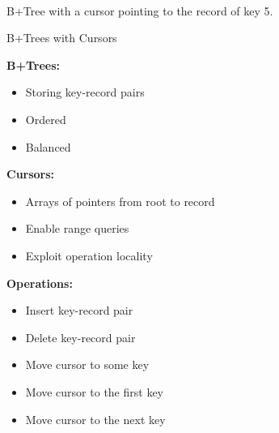 \documentclass[usenames,dvipsnames]{beamer}
\def\sublock#1{\textbf{#1:}\\\vspace{0.5cm}}
\def\subsep{\vspace{1cm}}
\begin{document}
\begin{frame}[fragile]
\begin{columns}[T]
\begin{column}{.5\textwidth}
\begin{center}
  \\
  B+Tree with a cursor pointing to the record of key 5.
\end{center}

\begin{block}{B+Trees with Cursors}
  \vspace{-1cm}
  \setlength{\columnsep}{10cm}
  \begin{multicols}{2}
  \sublock{B+Trees}
  \begin{itemize}
  \item Storing key-record pairs
  \item Ordered
  \item Balanced
  \end{itemize}
  \subsep
  
  \sublock{Cursors}
  \begin{itemize}
  \item Arrays of pointers from root to record
  \item Enable range queries
  \item Exploit operation locality
  \end{itemize}
  \vfill\null
  \columnbreak
  
  \sublock{Operations}
  \begin{itemize}
  \item Insert key-record pair
  \item {\color{title}Delete key-record pair}
  \item Move cursor to some key
  \item Move cursor to the first key
  \item Move cursor to the next key
  \end{itemize}
  \end{multicols}
\end{block}


\end{column}
\end{columns}
\end{frame}
\end{document}
